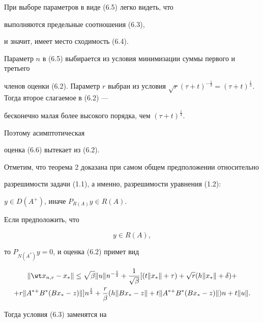 \begin{pf}


При выборе параметров в виде (6.5) легко видеть, что


выполняются предельные соотношения (6.3),


и значит, имеет место сходимость (6.4).





Параметр $n$ в (6.5) выбирается из условия минимизации суммы первого и третьего 


членов оценки (6.2). Параметр $r$ выбран из условия $\sqrt{r}(\tau+t)^{-\frac


{1}{3}}=(\tau+t)^{\frac{1}{3}}$. Тогда второе слагаемое в (6.2) ---


бесконечно малая более высокого порядка, чем $(\tau+t)^{\frac{1}{3}}$.


Поэтому асимптотическая 


оценка (6.6) вытекает из (6.2).


\end{pf}





Отметим, что теорема 2 доказана при самом общем предположении относительно 


разрешимости задачи (1.1), а именно, разрешимости уравнения (1.2):


$y \in D(A^+)$, иначе $P_{R(A)}y\in R(A)$.





Если предположить, что


$$


y\in R(A),


$$


то $P_{N(A^*)}y=0$, и оценка (6.2) примет вид


\begin{multline}


\| \wt x_{n,r}-x_*\| \le \sqrt{\beta}\|u\|n^{-\frac{1}{2}}+


\frac{1}{\sqrt {\beta}}[(t\|x_*\|+\tau)+\sqrt{r}(h\|x_*\|+\delta)+\\


%


+r\|A^{*+}B^*(Bx_*-z)\|]n^{\frac{1}{2}}+


\frac{r}{\beta}(h \|Bx_*-z\|+t\|A^{*+}B^*(Bx_*-z)\|)n+t\|u\|.


\end{multline}


Тогда условия (6.3) заменятся на


